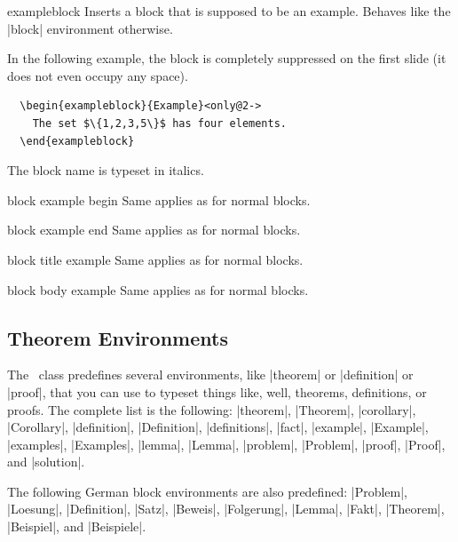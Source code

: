 \begin{environment}{{exampleblock}}
  Inserts a block that is supposed to be an example. Behaves like the |block| environment otherwise.

  \example
  In the following example, the block is completely suppressed on the first slide (it does not even occupy any space).
\begin{verbatim}
  \begin{exampleblock}{Example}<only@2->
    The set $\{1,2,3,5\}$ has four elements.
  \end{exampleblock}
\end{verbatim}

  \articlenote
  The block name is typeset in italics.

  \begin{element}{block example begin}\yes\no\no
    Same applies as for normal blocks.
  \end{element}

  \begin{element}{block example end}\yes\no\no
    Same applies as for normal blocks.
  \end{element}

  \begin{element}{block title example}\no\yes\yes
    Same applies as for normal blocks.
  \end{element}

  \begin{element}{block body example}\no\yes\yes
    Same applies as for normal blocks.
  \end{element}
\end{environment}


\subsection{Theorem Environments}
\label{section-theorems}

The \beamer\ class predefines several environments, like |theorem| or |definition| or |proof|, that you can use to typeset things like, well, theorems, definitions, or proofs. The complete list is the following:
|theorem|, |Theorem|, |corollary|, |Corollary|, |definition|, |Definition|, |definitions|, |fact|, |example|, |Example|, |examples|, |Examples|, |lemma|, |Lemma|, |problem|, |Problem|, |proof|, |Proof|, and |solution|.

The following German block environments are also predefined: |Problem|, |Loesung|, |Definition|, |Satz|, |Beweis|, |Folgerung|, |Lemma|, |Fakt|, |Theorem|, |Beispiel|, and |Beispiele|.

